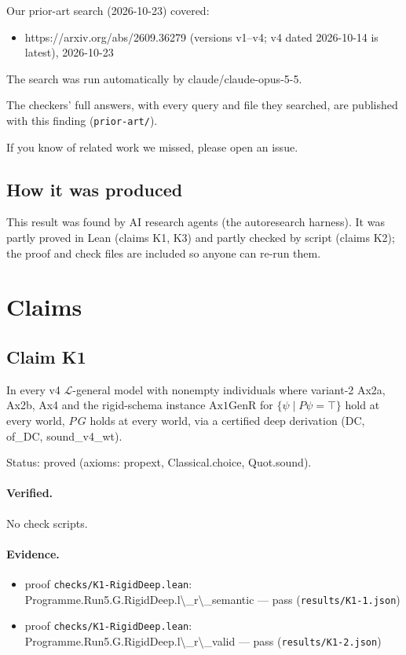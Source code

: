 \documentclass{article}
\begin{document}
Our prior-art search (2026-10-23) covered:

\begin{itemize}
\item https://arxiv.org/abs/2609.36279 (versions v1--v4; v4 dated 2026-10-14 is latest), 2026-10-23
\end{itemize}

The search was run automatically by claude/claude-opus-5-5.

The checkers' full answers, with every query and file they searched, are published with this finding (\texttt{prior-art/}).

If you know of related work we missed, please open an issue.

\subsection*{How it was produced}

This result was found by AI research agents (the autoresearch harness). It was partly proved in Lean (claims K1, K3) and partly checked by script (claims K2); the proof and check files are included so anyone can re-run them.

\section{Claims}

\subsection*{Claim K1}

In every v4 $\mathcal L$-general model with nonempty individuals where variant-2 Ax2a, Ax2b, Ax4 and the rigid-schema instance $\mathrm{Ax1GenR}$ for $\{\psi\mid P\psi=\top\}$ hold at every world, $P\,G$ holds at every world, via a certified deep derivation (DC, of\_DC, sound\_v4\_wt).

Status: proved (axioms: propext, Classical.choice, Quot.sound).

\paragraph{Verified.}
No check scripts.

\paragraph{Evidence.}
\begin{itemize}
\item proof \texttt{checks/K1-RigidDeep.lean}: Programme.Run5.G.RigidDeep.l\textbackslash{}\_r\textbackslash{}\_semantic --- pass (\texttt{results/K1-1.json})
\item proof \texttt{checks/K1-RigidDeep.lean}: Programme.Run5.G.RigidDeep.l\textbackslash{}\_r\textbackslash{}\_valid --- pass (\texttt{results/K1-2.json})
\end{itemize}
\end{document}
